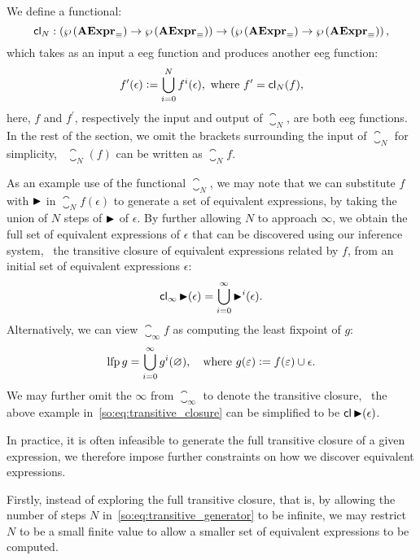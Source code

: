 We define a functional:
\begin{equation}
    \operatorname{\mathsf{cl}}_N:
        \left( \wp\left({\mathbf{AExpr}_\equiv}\right) \to \wp\left({\mathbf{AExpr}_\equiv}\right) \right) \to
        \left( \wp\left({\mathbf{AExpr}_\equiv}\right) \to \wp\left({\mathbf{AExpr}_\equiv}\right) \right),
\end{equation}
which takes as an input a \gls{eeg} function and produces another \gls{eeg}
function:
\begin{equation}
    f^\prime (\epsilon) \vcentcolon=
        \bigcup_{i = 0}^N f^i(\epsilon),
    \text{~where~} f^\prime = \operatorname{\mathsf{cl}}_N (f),
    \label{so:eq:transitive_generator}
\end{equation}
here, $f$ and $f^\prime$, respectively the input and output of $\closure_N$,
are both \gls{eeg} functions.  In the rest of the section, we omit the brackets
surrounding the input of $\closure_N$ for simplicity, \eg~$\closure_N (f)$ can
be written as $\closure_N f$.

As an example use of the functional $\closure_N$, we may note that we can
substitute $f$ with $\operatorname{\blacktriangleright}$ in $\closure_N f (\epsilon)$ to generate a set
of equivalent expressions, by taking the union of $N$ steps of $\operatorname{\blacktriangleright}$ of
$\epsilon$.  By further allowing $N$ to approach $\infty$, we obtain the full
set of equivalent expressions of $\epsilon$ that can be discovered using our
inference system, \ie~the transitive closure of equivalent expressions related
by $f$, from an initial set of equivalent expressions $\epsilon$:
\begin{equation}
    \operatorname{\mathsf{cl}}_\infty \operatorname{\blacktriangleright} (\epsilon) =
        \bigcup_{i = 0}^\infty \operatorname{\blacktriangleright}^i(\epsilon).
    \label{so:eq:transitive_closure}
\end{equation}
Alternatively, we can view $\closure_\infty f$ as computing the
least fixpoint of $g$:
\begin{equation}
    \operatorname{\mathrm{lfp}} g = \bigcup_{i = 0}^\infty g^i(\varnothing),
    \quad \text{where~} g(\varepsilon) \vcentcolon= f(\varepsilon) \cup \epsilon.
\end{equation}
We may further omit the $\infty$ from $\closure_\infty$ to denote the
transitive closure, \eg~the above example in~\eqref{so:eq:transitive_closure}
can be simplified to be $\operatorname{\mathsf{cl}} \operatorname{\blacktriangleright} (\epsilon)$.

In practice, it is often infeasible to generate the full transitive closure of
a given expression, we therefore impose further constraints on how we discover
equivalent expressions.

Firstly, instead of exploring the full transitive closure, that is, by allowing
the number of steps $N$ in~\eqref{so:eq:transitive_generator} to be infinite,
we may restrict $N$ to be a small finite value to allow a smaller set of
equivalent expressions to be computed.

